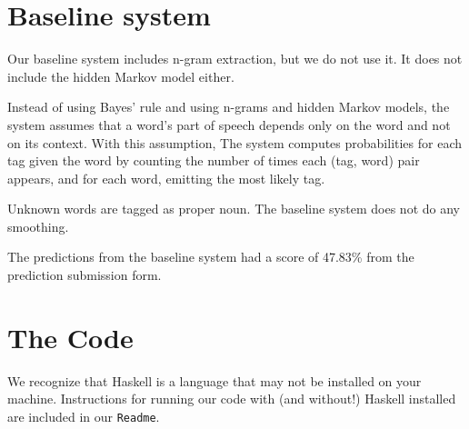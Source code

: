\documentclass{article}
\begin{document}
\section{Baseline system}
Our baseline system includes n-gram extraction,
but we do not use it.
It does not include the hidden Markov model either.

Instead of using Bayes' rule and using n-grams and hidden Markov models,
the system assumes that a word's part of speech depends only
on the word and not on its context. With this assumption,
The system computes probabilities for each tag given the word by counting the
number of times each (tag, word) pair appears, and for each word, emitting the
most likely tag.

Unknown words are tagged as proper noun.
The baseline system does not do any smoothing.

The predictions from the baseline system had a score of 47.83\%
from the prediction submission form.


\section{The Code}

We recognize that Haskell is a language that may not be installed on your
machine.  Instructions for running our code with (and without!) Haskell
installed are included in our \verb+Readme+.
\end{document}
